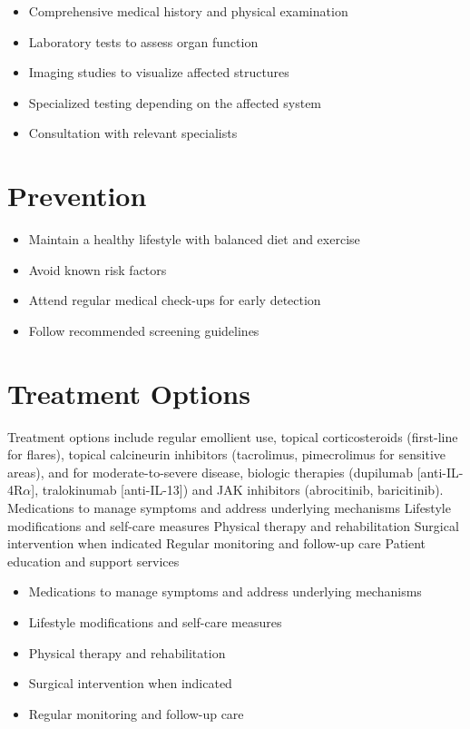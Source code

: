 \begin{itemize}[noitemsep]
  \item Comprehensive medical history and physical examination
  \item Laboratory tests to assess organ function
  \item Imaging studies to visualize affected structures
  \item Specialized testing depending on the affected system
  \item Consultation with relevant specialists
\end{itemize}
\section{Prevention}
\begin{itemize}[noitemsep]
  \item Maintain a healthy lifestyle with balanced diet and exercise
  \item Avoid known risk factors
  \item Attend regular medical check-ups for early detection
  \item Follow recommended screening guidelines
\end{itemize}
\section{Treatment Options}
Treatment options include regular emollient use, topical corticosteroids (first-line for flares), topical calcineurin inhibitors (tacrolimus, pimecrolimus for sensitive areas), and for moderate-to-severe disease, biologic therapies (dupilumab [anti-IL-4R$\alpha$], tralokinumab [anti-IL-13]) and JAK inhibitors (abrocitinib, baricitinib). Medications to manage symptoms and address underlying mechanisms Lifestyle modifications and self-care measures Physical therapy and rehabilitation Surgical intervention when indicated Regular monitoring and follow-up care Patient education and support services

\begin{itemize}[noitemsep]
  \item Medications to manage symptoms and address underlying mechanisms
  \item Lifestyle modifications and self-care measures
  \item Physical therapy and rehabilitation
  \item Surgical intervention when indicated
  \item Regular monitoring and follow-up care
\end{itemize}
